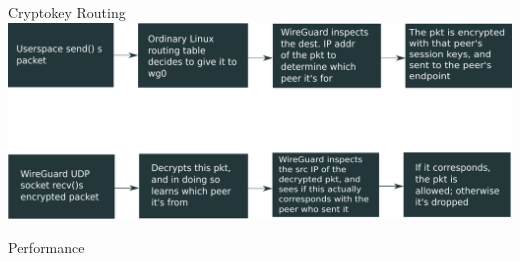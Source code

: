 \documentclass[xcolor=table]{beamer}
\begin{document}
    \begin{frame}[fragile]{Cryptokey Routing}
        \includegraphics[width=\textwidth]{crypto_route.pdf}
    \end{frame}
    \begin{frame}[fragile]{Performance}
        \begin{figure}
            \hspace*{-1cm} %
            \label{fig:example}%
        \end{figure}
    \end{frame}
\end{document}
